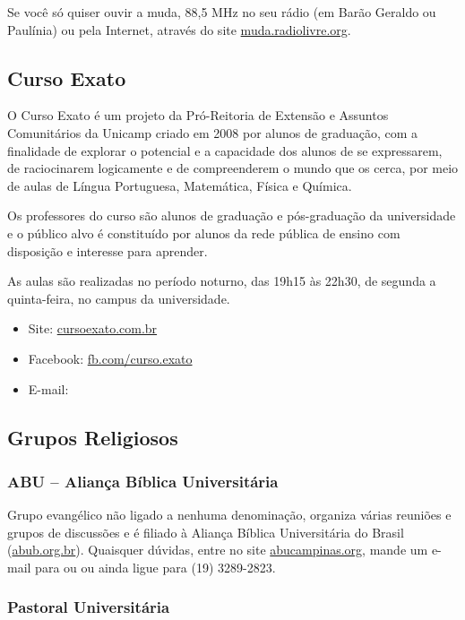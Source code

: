 Se você só quiser ouvir a muda, 88,5 MHz no seu rádio (em Barão Geraldo ou
Paulínia) ou pela Internet, através do site \url{muda.radiolivre.org}.

\subsection{Curso Exato}

O Curso Exato é um projeto da Pró-Reitoria de Extensão e Assuntos Comunitários
da Unicamp criado em 2008 por alunos de graduação, com a finalidade de explorar
o potencial e a capacidade dos alunos de se expressarem, de raciocinarem
logicamente e de compreenderem o mundo que os cerca, por meio de aulas de Língua
Portuguesa, Matemática, Física e Química.

Os professores do curso são alunos de graduação e pós-graduação da universidade
e o público alvo é constituído por alunos da rede pública de ensino com
disposição e interesse para aprender.

As aulas são realizadas no período noturno, das 19h15 às 22h30, de segunda
a quinta-feira, no campus da universidade.

\begin{itemize}
\item Site: \url{cursoexato.com.br}
\item Facebook: \url{fb.com/curso.exato}
\item E-mail: 
\end{itemize}

\subsection{Grupos Religiosos}

\subsubsection{ABU -- Aliança Bíblica Universitária}

Grupo evangélico não ligado a nenhuma denominação, organiza várias reuniões
e grupos de discussões e é filiado à Aliança Bíblica Universitária do Brasil
(\url{abub.org.br}). Quaisquer dúvidas, entre no site
\url{abucampinas.org}, mande um e-mail para 
ou  ou ainda ligue para (19)
3289-2823.

\subsubsection{Pastoral Universitária}

